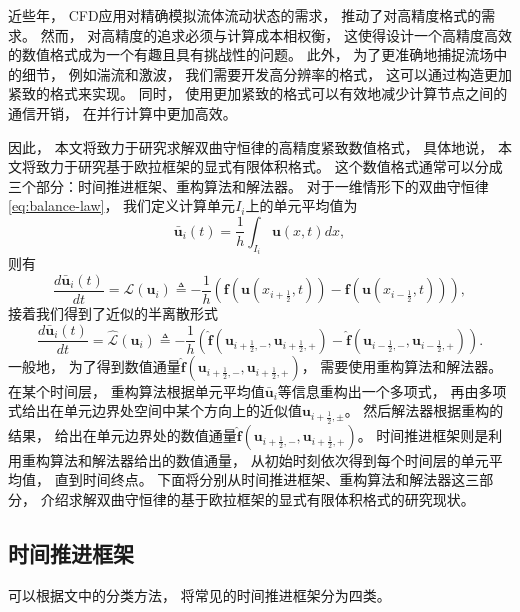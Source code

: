 近些年，
CFD应用对精确模拟流体流动状态的需求，
推动了对高精度格式的需求。
然而，
对高精度的追求必须与计算成本相权衡，
这使得设计一个高精度高效的数值格式成为一个有趣且具有挑战性的问题。
此外，
为了更准确地捕捉流场中的细节，
例如湍流和激波，
我们需要开发高分辨率的格式，
这可以通过构造更加紧致的格式来实现。
同时，
使用更加紧致的格式可以有效地减少计算节点之间的通信开销，
在并行计算中更加高效。

因此，
本文将致力于研究求解双曲守恒律的高精度紧致数值格式，
具体地说，
本文将致力于研究基于欧拉框架的显式有限体积格式。
这个数值格式通常可以分成三个部分：时间推进框架、重构算法和解法器。
对于一维情形下的双曲守恒律 \cref{eq:balance-law}，
我们定义计算单元$I_i$上的单元平均值为
\begin{equation}
  \bar{\bm{u}}_{i}(t)=\frac{1}{h}\int_{I_{i}} {\bm{u}}(x,t) dx,
\end{equation}
则有
\begin{equation}
  \frac{d \bar{\bm{u}}_i(t)}{dt} = \mathcal{L}({\bm{u}}_i) \triangleq -\frac{1}{h} \left({\bm{f}}({\bm{u}}(x_{i+\frac 12},t)) - {\bm{f}}({\bm{u}}(x_{i-\frac 12},t))\right),
\end{equation}
接着我们得到了近似的半离散形式
\begin{equation}
  \label{eq:semi-uniform}
  \frac{d \bar{\bm{u}}_i(t)}{dt} = \hat{\mathcal{L}}({\bm{u}}_i) \triangleq -\frac{1}{h} \left(\hat{\bm{f}}({\bm{u}}_{i+\frac 12,-},{\bm{u}}_{i+\frac 12,+}) - \hat{\bm{f}}({\bm{u}}_{i-\frac 12,-},{\bm{u}}_{i-\frac 12,+})\right).
\end{equation}
一般地，
为了得到数值通量$\hat{\bm{f}}({\bm{u}}_{i+\frac 12,-},{\bm{u}}_{i+\frac 12,+})$，
需要使用重构算法和解法器。
在某个时间层，
重构算法根据单元平均值$\bar{\bm{u}}_{i}$等信息重构出一个多项式，
再由多项式给出在单元边界处空间中某个方向上的近似值${\bm u}_{i+\frac{1}{2},\pm}$。
然后解法器根据重构的结果，
给出在单元边界处的数值通量$\hat{\bm{f}}({\bm{u}}_{i+\frac 12,-},{\bm{u}}_{i+\frac 12,+})$。
时间推进框架则是利用重构算法和解法器给出的数值通量，
从初始时刻依次得到每个时间层的单元平均值，
直到时间终点。
下面将分别从时间推进框架、重构算法和解法器这三部分，
介绍求解双曲守恒律的基于欧拉框架的显式有限体积格式的研究现状。

\subsection{时间推进框架}

可以根据文\cite{MSMD}中的分类方法，
将常见的时间推进框架分为四类。

